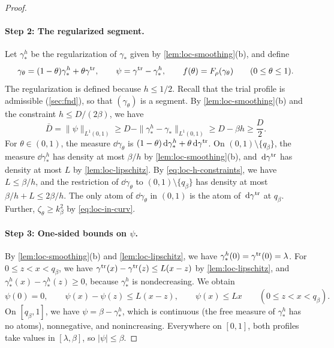 \begin{proof}
\paragraph{Step 2: The regularized segment.}
Let $\gamma_*^h$ be the regularization of $\gamma_*$ given by
\cref{lem:loc-smoothing}(b), and define
\[
 \gamma_\theta=(1-\theta)\gamma_*^h+\theta\gamma^{\rm tr},\qquad
 \psi=\gamma^{\rm tr}-\gamma_*^h,\qquad f(\theta)=F_\rho(\gamma_\theta)
 \qquad(0\le\theta\le1).
\]
The regularization is defined because $h\le1/2$. Recall that the trial
profile is admissible (\cref{sec:fnd}), so that $(\gamma_\theta)$ is a
segment. By
\cref{lem:loc-smoothing}(b) and the constraint $h\le D/(2\beta)$, we have
\[
 \bar D=\|\psi\|_{L^1(0,1)}\ge D-\|\gamma_*^h-\gamma_*\|_{L^1(0,1)}
 \ge D-\beta h\ge\frac D2 .
\]
For $\theta\in(0,1)$, the measure $\dd\gamma_\theta$ is
$(1-\theta)\,\mathrm d\gamma_*^h+\theta\,\mathrm d\gamma^{\rm tr}$. On
$(0,1)\setminus\{q_\beta\}$, the measure $\dd\gamma_*^h$ has density at most
$\beta/h$ by \cref{lem:loc-smoothing}(b), and $\,\mathrm d\gamma^{\rm tr}$ has density
at most $L$ by \cref{lem:loc-lipschitz}. By \eqref{eq:loc-h-constraints}, we
have $L\le\beta/h$, and the restriction of $\dd\gamma_\theta$ to
$(0,1)\setminus\{q_\beta\}$ has density at most $\beta/h+L\le2\beta/h$. The
only atom of $\dd\gamma_\theta$ in $(0,1)$ is the atom of $\,\mathrm d\gamma^{\rm tr}$
at $q_\beta$. Further, $\zeta_\theta\ge k_\beta^2$ by \eqref{eq:loc-in-curv}.

\paragraph{Step 3: One-sided bounds on $\psi$.}
By \cref{lem:loc-smoothing}(b) and \cref{lem:loc-lipschitz}, we have
$\gamma_*^h(0)=\gamma^{\rm tr}(0)=\lambda$. For $0\le z<x<q_\beta$, we have
$\gamma^{\rm tr}(x)-\gamma^{\rm tr}(z)\le L(x-z)$ by \cref{lem:loc-lipschitz},
and $\gamma_*^h(x)-\gamma_*^h(z)\ge0$, because $\gamma_*^h$ is nondecreasing. We
obtain
\begin{equation}\label{eq:loc-onesided}
 \psi(0)=0,\qquad
 \psi(x)-\psi(z)\le L(x-z),\qquad
 \psi(x)\le Lx\qquad(0\le z<x<q_\beta).
\end{equation}
On $[q_\beta,1]$, we have $\psi=\beta-\gamma_*^h$, which is continuous (the
free measure of $\gamma_*^h$ has no atoms), nonnegative, and nonincreasing.
Everywhere on $[0,1]$, both profiles take values in $[\lambda,\beta]$, so
$|\psi|\le\beta$.


\end{proof}
